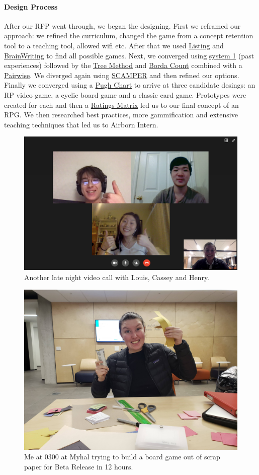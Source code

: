 \documentclass[paper=a4, fontsize=11pt]{article} %
\begin{document}
        \paragraph{Design Process}
        After our RFP went through, we began the designing. First we reframed our approach: we refined the curriculum, changed the game from a concept retention tool to a teaching tool, allowed wifi etc. After that we used \hyperlink{listlink}{Listing} and \hyperlink{bwlink}{BrainWriting} to find all possible games. Next, we converged using \hyperlink{sys1v2}{system 1} (past experiences) followed by the \hyperlink{treelink}{Tree Method} and \hyperlink{bordalink}{Borda Count} combined with a \hyperlink{pairlink}{Pairwise}. We diverged again using \hyperlink{scamplink}{SCAMPER} and then refined our options. Finally we converged using a \hyperlink{pughlink}{Pugh Chart} to arrive at three candidate desings: an RP video game, a cyclic board game and a classic card game. Prototypes were created for each and then a \hyperlink{ratlink}{Ratings Matrix} led us to our final concept of an RPG. We then researched best practices, more gammification and extensive teaching techniques that led us to Airborn Intern. 
        \begin{figure}[H]
            \centering
            \includegraphics[width=0.6\linewidth]{praxis22.png}
            \caption{Another late night video call with Louis, Cassey and Henry.}
        \end{figure}
        \begin{figure}[H]
            \centering
            \includegraphics[width=0.6\linewidth]{praxis21.jpg}
            \caption{Me at 0300 at Myhal trying to build a board game out of scrap paper for Beta Release in 12 hours.}
        \end{figure}
\end{document}
